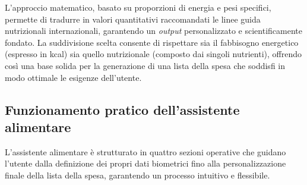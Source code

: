 \documentclass[11pt,a4paper]{article}
\begin{document}
L'approccio matematico, basato su proporzioni di energia e pesi specifici, permette di tradurre in valori quantitativi raccomandati le linee guida nutrizionali internazionali, garantendo un \textit{output} personalizzato e scientificamente fondato. La suddivisione scelta consente di rispettare sia il fabbisogno energetico (espresso in kcal) sia quello nutrizionale (composto dai singoli nutrienti), offrendo così una base solida per la generazione di una lista della spesa che soddisfi in modo ottimale le esigenze dell’utente.

\subsection{Funzionamento pratico dell’assistente alimentare}
L’assistente alimentare è strutturato in quattro sezioni operative che guidano l’utente dalla definizione dei propri dati biometrici fino alla personalizzazione finale della lista della spesa, garantendo un processo intuitivo e flessibile.
\end{document}
